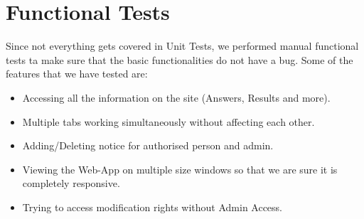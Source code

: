 \documentclass{mnnit}
\begin{document}
\section{Functional Tests}
Since not everything gets covered in Unit Tests, we performed manual functional tests ta make sure that the basic functionalities do not have a bug.  Some of the features that we have tested are:
\begin{itemize}
	\item Accessing all the information on the site (Answers, Results and more).
	\item Multiple tabs working simultaneously without affecting each other.
	\item Adding/Deleting notice for authorised person and admin.
	\item Viewing the Web-App on multiple size windows so that we are sure it is completely responsive.
	\item Trying to access modification rights without Admin Access.
\end{itemize}
\end{document}
